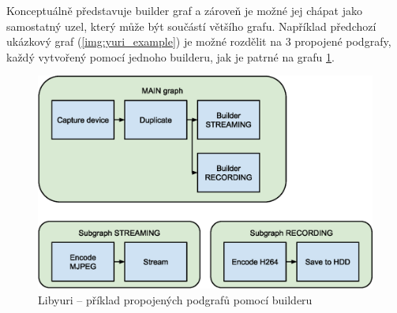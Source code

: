 \documentclass[thesis=M,czech]{FITthesis}[2012/06/26]
\begin{document}
Konceptuálně představuje builder graf a zároveň je možné jej chápat jako samostatný uzel, který může být součástí většího grafu. Například předchozí ukázkový graf (\ref{img:yuri_example}) je možné rozdělit na 3 propojené podgrafy, každý vytvořený pomocí jednoho builderu, jak je patrné na grafu \ref{img:yuri_subgraph}.
\\
\begin{figure}[h]\centering
	\includegraphics[width=1\textwidth]{images/yuri_subgraph.eps}
	\caption{Libyuri -- příklad propojených podgrafů pomocí builderu}\label{img:yuri_subgraph}
\end{figure}
\end{document}
